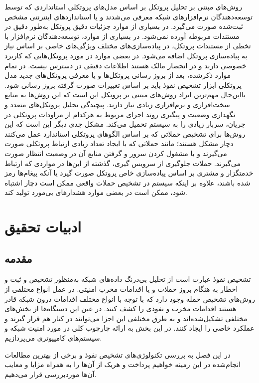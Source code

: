 \documentclass[a4paper,oneside,12pt]{report}
\begin{document}
روش‌های مبتنی بر تحلیل پروتکل بر اساس مدل‌های پروتکلی استانداردی که توسط توسعه‌دهندگان نرم‌افزارهای شبکه معرفی می‌شدند و یا استانداردهای اینترنتی مشخص ثبت‌شده صورت می‌گیرد. در بسیاری از موارد جزئیات دقیق پروتکل به‌طور دقیق در مستندات مربوطه آورده نمی‌شود. در بسیاری از موارد، توسعه‌دهندگان نرم‌افزار با تخطی از مستندات پروتکل، در پیاده‌سازی‌های مختلف ویژگی‌های خاصی بر اساس نیاز به پیاده‌سازی پروتکل اضافه می‌شود. در بعضی موارد در مورد پروتکل‌هایی که کاربرد خصوصی دارند و در انحصار مالک هستند اطلاعات دقیقی در دسترس نیست. در تمام موارد ذکرشده، بعد از بروز رسانی پروتکل‌ها و یا معرفی پروتکل‌های جدید مدل پروتکلی ابزار تشخیص نفوذ باید بر اساس تغییرات صورت گرفته بروز رسانی شود. بااین‌حال مهم‌ترین ایراد روش‌های مبتنی بر پروتکل این است که این روش‌ها به منابع سخت‌افزاری و نرم‌افزاری زیادی نیاز دارند. پیچیدگی تحلیل پروتکل‌های متعدد و نگهداری وضعیت و پیگیری روند اجرای مربوط به هرکدام از مراودات پروتکلی در جریان، سربار زیادی را به سیستم تحمیل می‌کند. مشکل جدی دیگر این است که این روش‌ها برای تشخیص حملاتی که بر اساس الگوهای پروتکلی استاندارد عمل می‌کنند دچار مشکل هستند؛ مانند حملاتی که با ایجاد تعداد زیادی ارتباط پروتکلی صورت می‌گیرند و با مشغول کردن سرور و گرفتن منابع آن در وضعیت انتظار صورت می‌گیرند. حملات جلوگیری از سرویس گیری، گذشته از این‌ها در مواردی که ارتباط خدمتگزار و مشتری بر اساس پیاده‌سازی خاص پروتکل صورت گیرد یا آنکه پیغام‌ها رمز شده باشند، علاوه بر اینکه سیستم در تشخیص حملات واقعی ممکن است دچار اشتباه شود، ممکن است در بعضی موارد هشدارهای بی‌مورد تولید کند.
\chapter{ادبیات تحقیق}
 \section{مقدمه}
 تشخیص نفوذ عبارت است از تحلیل بی‌درنگ داده‌های شبکه به‌منظور تشخیص و ثبت و اخطار به هنگام بروز حملات و یا اقدامات مخرب امنیتی. در عمل انواع مختلفی از روش‌های تشخیص حمله وجود دارد که با توجه با انواع مختلف اقدامات درون شبکه قادر هستند اقدامات مخرب و نفوذی را کشف کنند. در عین این دستگاه‌ها از بخش‌های مختلفی تشکیل‌شده‌اند و به طرق مختلفی این اجزا می‌توانند در کنار هم قرار گیرند و عملکرد خاصی را ایجاد کنند. در این بخش به ارائه چارچوب کلی در مورد امنیت شبکه و سیستم‌های کامپیوتری می‌پردازیم. 
 
 در این فصل به بررسی تکنولوژی‌های تشخیص نفوذ و برخی از بهترین مطالعات انجام‌شده در این زمینه خواهیم پرداخت و هریک از آن‌ها را به همراه مزایا و معایب آن‌ها موردبررسی قرار می‌دهیم.
\end{document}

